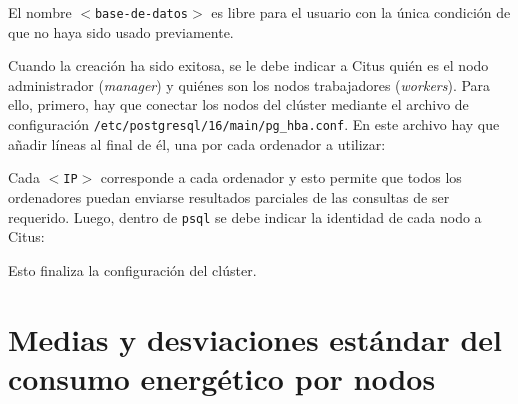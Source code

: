 \documentclass[12pt, letter paper]{report}
\begin{document}
      

      El nombre $<$\texttt{base-de-datos}$>$ es libre para el usuario con la
      única condición de que no haya sido usado previamente.

      Cuando la creación ha sido exitosa, se le debe indicar a Citus quién
      es el nodo administrador (\textit{manager}) y quiénes son los nodos
      trabajadores (\textit{workers}). Para ello, primero, hay que conectar
      los nodos del clúster mediante el archivo de configuración
      \texttt{/etc/postgresql/16/main/pg\_hba.conf}. En este archivo hay que
      añadir líneas al final de él, una por cada ordenador a utilizar:

      

      Cada $<$\texttt{IP}$>$ corresponde a cada ordenador y esto permite que
      todos los ordenadores puedan enviarse resultados parciales de las
      consultas de ser requerido. Luego, dentro de \texttt{psql} se debe
      indicar la identidad de cada nodo a Citus:

      

      Esto finaliza la configuración del clúster.


  \chapter{Medias y desviaciones estándar del consumo energético por nodos}
  \label{apx:nodos}
\end{document}
